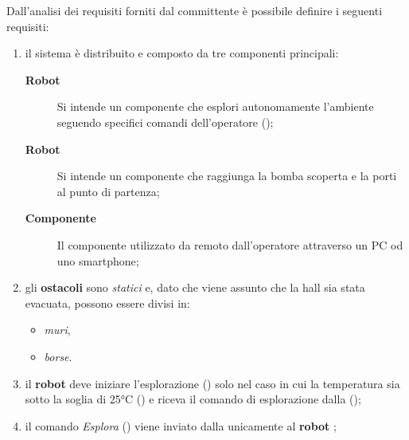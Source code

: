 

Dall'analisi dei requisiti forniti dal committente è possibile definire i seguenti requisiti:

\begin{enumerate}
  \item
    il sistema è distribuito e composto da tre componenti principali:
    \begin{description}
      \item[\textbf{Robot }] Si intende un componente che esplori autonomamente l'ambiente seguendo specifici comandi dell'operatore ();
      \item[\textbf{Robot }] Si intende un componente che raggiunga la bomba scoperta e la porti al punto di partenza;
      \item[\textbf{Componente }] Il componente utilizzato da remoto dall'operatore attraverso un PC od uno smartphone;
    \end{description}

  \item
    gli \textbf{ostacoli} sono \textit{statici} e, dato che viene assunto che la hall sia stata evacuata, possono essere divisi in:
    \begin{itemize}
      \item \textit{muri},
      \item \textit{borse}.
    \end{itemize}

  \item
    il \textbf{robot } deve iniziare l'esplorazione () solo nel caso in cui la temperatura sia sotto la soglia di 25°C () e riceva il comando di esplorazione dalla \textbf{} ();

  \item
    il comando \textit{Esplora} () viene inviato dalla \textbf{} unicamente al \textbf{robot };


\end{enumerate}
